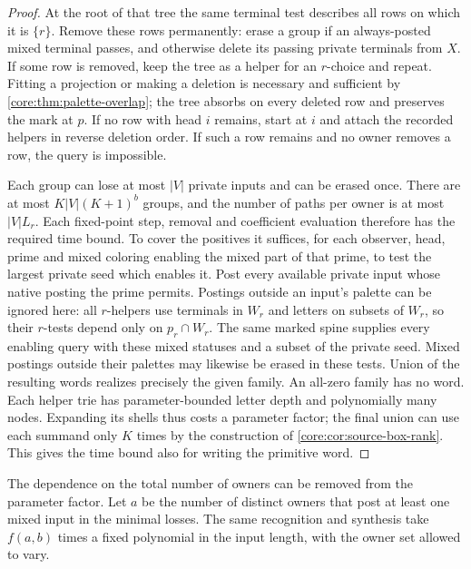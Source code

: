 \begin{proof}
At the root of that tree the same terminal test describes all
rows on which it is $\{r\}$. Remove these rows permanently:
erase a group if an always-posted mixed terminal passes, and
otherwise delete its passing private terminals from $X$. If some
row is removed, keep the tree as a helper for an $r$-choice and
repeat. Fitting a projection or making a deletion is necessary
and sufficient by \cref{core:thm:palette-overlap}; the tree
absorbs on every deleted row and preserves the mark at $p$.
If no row with head $i$ remains, start at $i$ and attach the
recorded helpers in reverse deletion order. If such a row remains
and no owner removes a row, the query is impossible.

Each group can lose at most $|V|$ private inputs and can be erased
once. There are at most $K|V|(K+1)^b$ groups, and the number of paths
per owner is at most $|V|L_r$. Each fixed-point step, removal and
coefficient evaluation therefore has the required time bound.
To cover the positives it suffices, for each observer, head, prime
and mixed coloring enabling the mixed part of that prime, to test
the largest private seed which enables it. Post every available
private input whose native posting the prime permits. Postings
outside an input's palette can be ignored here: all $r$-helpers
use terminals in $W_r$ and letters on subsets of $W_r$, so their
$r$-tests depend only on $p_r\cap W_r$. The same marked spine
supplies every enabling query with these mixed statuses and a
subset of the private seed. Mixed postings outside their palettes
may likewise be erased in these tests. Union of the resulting
words realizes precisely the given family. An all-zero family
has no word. Each helper trie has parameter-bounded letter depth
and polynomially many nodes. Expanding its shells thus costs a
parameter factor; the final union can use each summand only $K$
times by the construction of \cref{core:cor:source-box-rank}.
This gives the time bound also for writing the primitive word.
\end{proof}

The dependence on the total number of owners can be
removed from the parameter factor. Let $a$ be the number
of distinct owners that post at least one mixed input
in the minimal losses. The same recognition and synthesis
take $f(a,b)$ times a fixed polynomial in the input
length, with the owner set allowed to vary.


